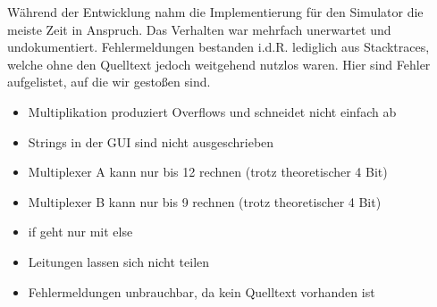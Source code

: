 Während der Entwicklung nahm die Implementierung für den Simulator die meiste Zeit in Anspruch. Das Verhalten war mehrfach unerwartet und undokumentiert. Fehlermeldungen bestanden i.d.R. lediglich aus Stacktraces, welche ohne den Quelltext jedoch weitgehend nutzlos waren. Hier sind Fehler aufgelistet, auf die wir gestoßen sind.

\begin{itemize}
    \item Multiplikation produziert Overflows und schneidet nicht einfach ab
    \item Strings in der GUI sind nicht ausgeschrieben
    \item Multiplexer A kann nur bis 12 rechnen (trotz theoretischer 4 Bit)
    \item Multiplexer B kann nur bis 9 rechnen (trotz theoretischer 4 Bit)
    \item if geht nur mit else
    \item Leitungen lassen sich nicht teilen
    \item Fehlermeldungen unbrauchbar, da kein Quelltext vorhanden ist
\end{itemize}
